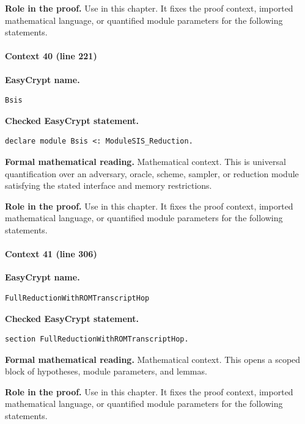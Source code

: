 \noindent\textbf{Role in the proof.}
Use in this chapter. It fixes the proof context, imported mathematical language, or quantified module parameters for the following statements.

\paragraph{Context 40 (line 221)}
\noindent\textbf{EasyCrypt name.}
\begin{lstlisting}[language=EasyCrypt,basicstyle=\ttfamily\scriptsize]
Bsis
\end{lstlisting}
\noindent\textbf{Checked EasyCrypt statement.}
\begin{lstlisting}[language=EasyCrypt,basicstyle=\ttfamily\scriptsize]
declare module Bsis <: ModuleSIS_Reduction.
\end{lstlisting}
\noindent\textbf{Formal mathematical reading.}
Mathematical context. This is universal quantification over an adversary, oracle, scheme, sampler, or reduction module satisfying the stated interface and memory restrictions.

\noindent\textbf{Role in the proof.}
Use in this chapter. It fixes the proof context, imported mathematical language, or quantified module parameters for the following statements.

\paragraph{Context 41 (line 306)}
\noindent\textbf{EasyCrypt name.}
\begin{lstlisting}[language=EasyCrypt,basicstyle=\ttfamily\scriptsize]
FullReductionWithROMTranscriptHop
\end{lstlisting}
\noindent\textbf{Checked EasyCrypt statement.}
\begin{lstlisting}[language=EasyCrypt,basicstyle=\ttfamily\scriptsize]
section FullReductionWithROMTranscriptHop.
\end{lstlisting}
\noindent\textbf{Formal mathematical reading.}
Mathematical context. This opens a scoped block of hypotheses, module parameters, and lemmas.

\noindent\textbf{Role in the proof.}
Use in this chapter. It fixes the proof context, imported mathematical language, or quantified module parameters for the following statements.

